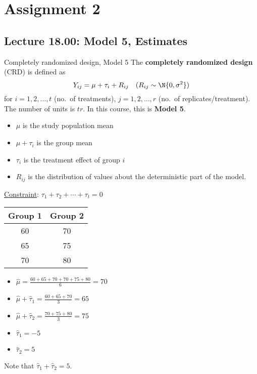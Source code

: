 \chapter{Assignment 2}
\section{Lecture 18.00: Model 5, Estimates}
\begin{Definition}{Completely randomized design, Model 5}{}
      The \textbf{completely randomized design} (CRD) is defined as
      \[ Y_{ij}=\mu+\tau_i+R_{ij}\quad(R_{ij}\sim \N{0,\sigma^2}) \]
      for $ i=1,2,\ldots,t $ (no.\ of treatments),
      $ j=1,2,\ldots,r $ (no.\ of replicates/treatment).
      The number of units is $ tr $. In this course,
      this is \textbf{Model 5}.
      \begin{itemize}
            \item $ \mu $ is the study population mean
            \item $ \mu+\tau_i $ is the group mean
            \item $ \tau_i $ is the treatment effect of group $ i $
            \item $ R_{ij} $ is the distribution of values about the deterministic
                  part of the model.
      \end{itemize}
      \underline{Constraint}: $ \tau_1+\tau_2+\cdots+\tau_t=0 $
\end{Definition}
\begin{Example}{}{}
      \begin{center}
            \begin{NiceTabular}{cc}
                  Group 1 & Group 2 \\
                        & 70      \\
                  65      & 75      \\
                  70      & 80      \\
            \end{NiceTabular}
      \end{center}
      \begin{itemize}
            \item $ \hat{\mu}=\frac{60+65+70+70+75+80}{6} =70 $
            \item $ \hat{\mu}+\hat{\tau}_1=\frac{60+65+70}{3}=65 $
            \item $ \hat{\mu}+\hat{\tau}_2=\frac{70+75+80}{3}=75 $
            \item $ \hat{\tau}_1=-5 $
            \item $ \hat{\tau}_2=5 $
      \end{itemize}
      Note that $ \hat{\tau}_1+\hat{\tau}_2=5 $.
\end{Example}

